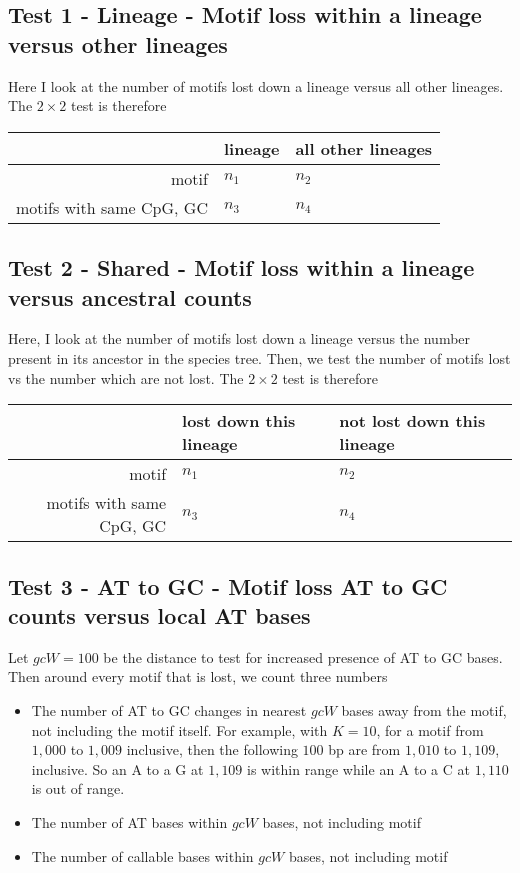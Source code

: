 \documentclass{article}\usepackage[]{graphicx}\usepackage[]{color}
\begin{document}
\subsection*{Test 1 - Lineage - Motif loss within a lineage versus other lineages}

Here I look at the number of motifs lost down a lineage versus all other lineages. The $2\times2$ test is therefore

\begin{tabular}{r | l l }
& lineage & all other lineages \\\hline
motif & $n_1$ & $n_2$ \\
motifs with same CpG, GC & $n_3$ & $n_4$ \\
\end{tabular}

\subsection*{Test 2 - Shared - Motif loss within a lineage versus ancestral counts}

Here, I look at the number of motifs lost down a lineage versus the number present in its ancestor in the species tree. Then, we test the number of motifs lost vs the number which are not lost. The $2\times2$ test is therefore

\begin{tabular}{r | l l }
& lost down this lineage & not lost down this lineage \\\hline
motif & $n_1$ & $n_2$ \\
motifs with same CpG, GC & $n_3$ & $n_4$ \\
\end{tabular}
  
\subsection*{Test 3 - AT to GC - Motif loss AT to GC counts versus local AT bases}
  
Let $gcW=100$ be the distance to test for increased presence of AT to GC
bases. Then around every motif that is lost, we count three numbers
\begin{itemize}
\item The number of AT to GC changes in nearest $gcW$ bases away from the motif, not including the motif itself. For example, with $K=10$, for a motif from $1,000$ to $1,009$ inclusive, then the following $100$ bp are from $1,010$ to $1,109$, inclusive. So an A to a G at $1,109$ is within range while an A to a C at $1,110$ is out of range.
\item The number of AT bases within $gcW$ bases, not including motif
\item The number of callable bases within $gcW$ bases, not including motif
\end{itemize}
\end{document}
